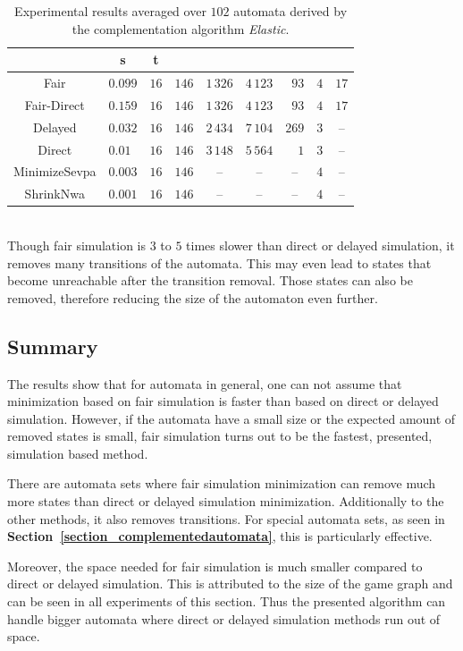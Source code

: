 \documentclass[12pt,oneside,bibliography=totoc,abstracton]{scrartcl}
\newcommand{\emptyccell}{\multicolumn{1}{c}{--}}
\newcommand{\emptyccellrightended}{\multicolumn{1}{c|}{--}}
\newcommand{\sectionref}[1]{\textbf{Section~\ref{#1}}}
\begin{document}
\begin{table}[h]
\begin{center}
\begin{tabular}{|c|lrrrrrrr|}
			&\multicolumn{1}{c}{\cellcolor{black!30}\textbf{s}}
			&\multicolumn{1}{c|}{\cellcolor{black!30}\textbf{t}}\\
			\hline
			Fair			&$0.099$	&$16$	&$146$	&$1\,326$	&$4\,123$	&$93$		&$4$	&$17$\\
			Fair-Direct		&$0.159$	&$16$	&$146$	&$1\,326$	&$4\,123$	&$93$		&$4$	&$17$\\
			Delayed		&$0.032$	&$16$	&$146$	&$2\,434$	&$7\,104$	&$269$	&$3$	&\emptyccellrightended\\
			Direct			&$0.01$	&$16$	&$146$	&$3\,148$	&$5\,564$	&$1$		&$3$	&\emptyccellrightended\\
			MinimizeSevpa	&$0.003$	&$16$	&$146$	&\emptyccell	&\emptyccell	&\emptyccell	&$4$	&\emptyccellrightended\\
			ShrinkNwa		&$0.001$	&$16$	&$146$	&\emptyccell	&\emptyccell	&\emptyccell	&$4$	&\emptyccellrightended\\
			\hline
		\end{tabular}
	\end{center}
	\caption{Experimental results averaged over $102$ automata derived by the
		complementation algorithm \textit{Elastic}.}
	\label{complementelastic}
\end{table}\quad\\
Though fair simulation is $3$ to $5$ times slower than direct or delayed simulation, it removes many transitions of the automata.
This may even lead to states that become unreachable after the transition removal. Those states can also be removed,
therefore reducing the size of the automaton even further.

\subsection{Summary}
The results show that for automata in general, one can not assume that minimization based on fair simulation
is faster than based on direct or delayed simulation.
However, if the automata have a small size or the expected amount of removed states is small, fair simulation
turns out to be the fastest, presented, simulation based method.

There are automata sets where fair simulation minimization can remove much more states than direct or delayed simulation minimization.
Additionally to the other methods, it also removes transitions.
For special automata sets, as seen in \sectionref{section_complementedautomata}, this is particularly effective.

Moreover, the space needed for fair simulation is much smaller compared to direct or delayed simulation.
This is attributed to the size of the game graph and can be seen in all experiments of this section.
Thus the presented algorithm can handle bigger automata where direct or delayed simulation methods run out of space.
\end{document}
